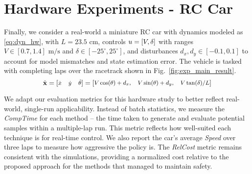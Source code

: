 \section{\label{case_rc_car}Hardware Experiments - RC Car}

Finally, we consider a real-world a miniature RC car with dynamics modeled as \eqref{eq:dyn_hw}, with $L=23.5 \text{ cm}$, controls $u=[V,\delta]$ with ranges $V \in [0.7,1.4]\text{ m/s}$ and $\delta \in [-25^{\circ},25^{\circ}]$, and disturbances $d_x,d_y \in [-0.1,0.1]$ to account for model mismatches and state estimation error. The vehicle is tasked with completing laps over the racetrack shown in Fig.~\ref{fig:exp_main_result}.
%
\setlength{\arraycolsep}{2pt} %
\begin{equation}\label{eq:dyn_hw}
{\fontsize{8.5}{10}\selectfont
\dot{\state}
= \begin{bmatrix} \dot{x} & \dot{y} & \dot{\theta} \end{bmatrix}
= \begin{bmatrix} V \cos(\theta)+ d_x, & V \sin(\theta)+ d_y, & V \tan(\delta) / L \end{bmatrix}
}
\end{equation}
\setlength{\arraycolsep}{5pt} %

We adapt our evaluation metrics for this hardware study to better reflect real-world, single-run applicability. Instead of batch statistics, we measure the \textit{CompTime} for each method -- the time taken to generate and evaluate potential samples within a multiple-lap run. This metric reflects how well-suited each technique is for real-time control. We also report the car's average \textit{Speed} over three laps to measure how aggressive the policy is. The \textit{RelCost} metric remains consistent with the simulations, providing a normalized cost relative to the proposed approach for the methods that managed to maintain safety.

